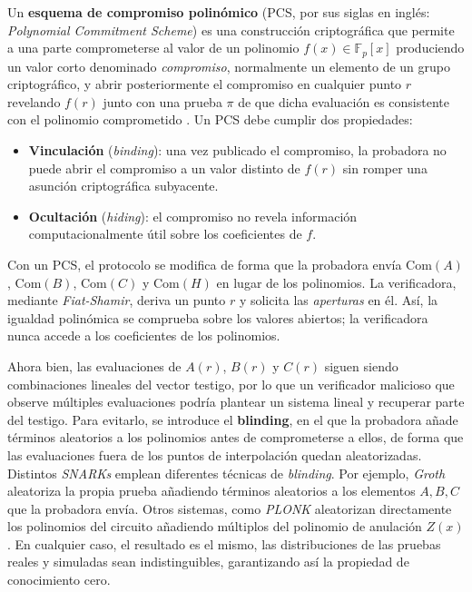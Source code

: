 \documentclass[a4paper, 11pt]{article}
\begin{document}
Un \textbf{esquema de compromiso polinómico} (PCS, por sus siglas en inglés: \textit{Polynomial Commitment
  Scheme}) es una construcción criptográfica que permite a una parte comprometerse al valor de un
polinomio $f(x) \in \mathbb{F}_p[x]$ produciendo un valor corto denominado \textit{compromiso},
normalmente un elemento de un grupo criptográfico, y abrir posteriormente el compromiso en cualquier
punto $r$ revelando $f(r)$ junto con una prueba $\pi$ de que dicha evaluación es consistente con el
polinomio comprometido \cite[Capítulo~7]{thaler2022proofs}. Un PCS debe cumplir dos propiedades:
\begin{itemize}
  \item \textbf{Vinculación} (\textit{binding}): una vez publicado el compromiso, la probadora no
        puede abrir el compromiso a un valor distinto de $f(r)$ sin romper una asunción criptográfica
        subyacente.
  \item \textbf{Ocultación} (\textit{hiding}): el compromiso no revela información computacionalmente
        útil sobre los coeficientes de $f$.
\end{itemize}

Con un PCS, el protocolo se modifica de forma que la probadora envía $\text{Com}(A)$, $\text{Com}(B)$,
$\text{Com}(C)$ y $\text{Com}(H)$ en lugar de los polinomios. La verificadora, mediante \textit{Fiat-Shamir},
deriva un punto $r$ y solicita las \textit{aperturas} en él. Así, la igualdad polinómica se comprueba
sobre los valores abiertos; la verificadora nunca accede a los coeficientes de los polinomios.

Ahora bien, las evaluaciones de $A(r)$, $B(r)$ y $C(r)$ siguen siendo combinaciones lineales del
vector testigo, por lo que un verificador malicioso que observe múltiples evaluaciones podría
plantear un sistema lineal y recuperar parte del testigo. Para evitarlo, se introduce el \textbf{blinding},
en el que la probadora añade términos aleatorios a los polinomios antes de comprometerse a ellos, de
forma que las evaluaciones fuera de los puntos de interpolación quedan aleatorizadas. Distintos
\textit{SNARKs} emplean diferentes técnicas de \textit{blinding}. Por ejemplo, \textit{Groth}
\cite{groth2016size} aleatoriza la propia prueba añadiendo términos aleatorios a los elementos $A, B, C$
que la probadora envía. Otros sistemas, como \textit{PLONK} \cite{plonk2019} aleatorizan directamente
los polinomios del circuito añadiendo múltiplos del polinomio de anulación $Z(x)$. En cualquier caso,
el resultado es el mismo, las distribuciones de las pruebas reales y simuladas sean indistinguibles,
garantizando así la propiedad de conocimiento cero.
\end{document}
